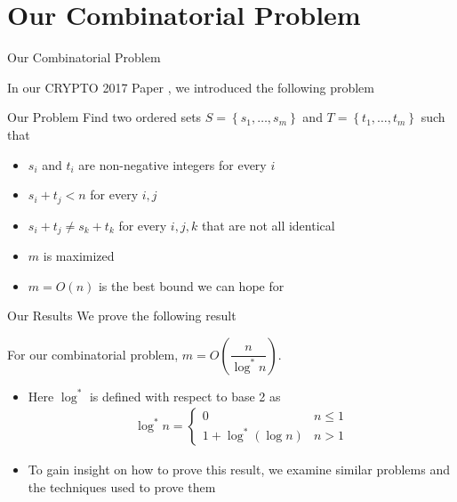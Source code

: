 \section{Our Combinatorial Problem}
\begin{frame}{Our Combinatorial Problem}

In our CRYPTO 2017 Paper \cite{C:BloMajNgu17}, we introduced the following problem

{
\begin{block}{Our Problem}
	Find two ordered sets $S = \left\lbrace s_1,\dotsc, s_m\right\rbrace$ and $T = \left\lbrace t_1,\dotsc, t_m\right\rbrace$ such that
	\begin{itemize}
		\item $s_i$ and $t_i$ are non-negative integers for every $i$
		\item $s_i + t_j < n$ for every $i,j$
		\item $s_i + t_j \neq s_k + t_k$ for every $i,j,k$ that are not all identical
		\item $m$ is maximized
	\end{itemize}
\end{block}}


\begin{itemize}
	\item<4-> $m = O(n)$ is the best bound we can hope for
\end{itemize}

\end{frame}

\begin{frame}{Our Results}
	We prove the following result
	{
	\begin{theorem}
		For our combinatorial problem, $m = O\left(\dfrac{n}{\log^*n}\right)$.
	\end{theorem}}

\begin{itemize}
	\item Here $\log^*$ is defined with respect to base 2 as
	\begin{align*}
		\log^* n = \begin{cases}
			0 & n\leq 1\\
			1 + \log^*(\log n) & n > 1
		\end{cases}
	\end{align*}
	\item To gain insight on how to prove this result, we examine similar problems and the techniques used to prove them
\end{itemize}

\end{frame}

